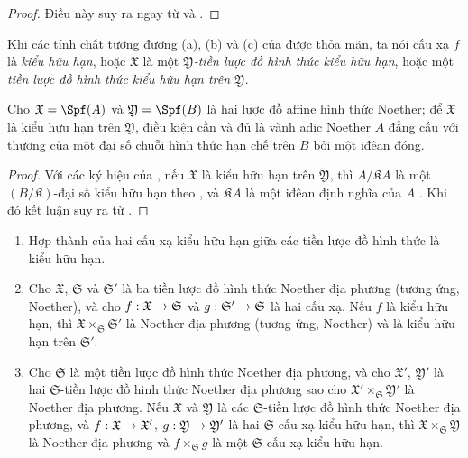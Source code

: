 \documentclass[oneside]{amsart}
\makeatletter
\newcommand{\ega@arrow}[2]{\mathchoice{#1}{#2}{#2}{#2}}
\renewcommand{\to}{\ega@arrow{\longrightarrow}{\rightarrow}}
\newcommand{\oldpage}[2][]{{\marginnote{\normalfont\textbf{#1}~|~#2}}\ignorespaces}
\let\EGAOriginalLabel\label
\renewcommand{\label}[1]{\phantomsection\EGAOriginalLabel{#1}}
\makeatother
\begin{document}
\begin{proof}
Điều này suy ra ngay từ  và .
\end{proof}

\begin{definition}[10.13.3]
\label{I.10.13.3}
Khi các tính chất tương đương (a), (b) và (c) của  được thỏa mãn, ta nói cấu xạ $f$ là \emph{kiểu hữu hạn}, hoặc $\mathfrak{X}$ là một \emph{$\mathfrak{Y}$-tiền lược đồ hình thức kiểu hữu hạn}, hoặc một \emph{tiền lược đồ hình thức kiểu hữu hạn trên $\mathfrak{Y}$}.
\end{definition}

\begin{corollary}[10.13.4]
\label{I.10.13.4}
Cho $\mathfrak{X}=\Spf(A)$ và $\mathfrak{Y}=\Spf(B)$ là hai lược đồ affine hình thức Noether;
để $\mathfrak{X}$ là kiểu hữu hạn trên $\mathfrak{Y}$, điều kiện cần và đủ là vành adic Noether $A$ đẳng cấu với thương của một đại số chuỗi hình thức hạn chế trên $B$ bởi một iđêan đóng.
\end{corollary}

\begin{proof}
Với các ký hiệu của , nếu $\mathfrak{X}$ là kiểu hữu hạn trên $\mathfrak{Y}$, thì $A/\mathfrak{K}A$ là một $(B/\mathfrak{K})$-đại số kiểu hữu hạn theo , và $\mathfrak{K}A$ là một iđêan định nghĩa của $A$ .
Khi đó kết luận suy ra từ .
\end{proof}

\begin{proposition}[10.13.5]
\label{I.10.13.5}
\medskip\noindent
\begin{enumerate}
  \item[\rm{(i)}] Hợp thành của hai cấu xạ kiểu hữu hạn giữa các tiền lược đồ hình thức là kiểu hữu hạn.
\oldpage[I]{209}
  \item[\rm{(ii)}] Cho $\mathfrak{X}$, $\mathfrak{S}$ và $\mathfrak{S}'$ là ba tiền lược đồ hình thức Noether địa phương (tương ứng, Noether), và cho $f:\mathfrak{X}\to\mathfrak{S}$ và $g:\mathfrak{S}'\to\mathfrak{S}$ là hai cấu xạ.
    Nếu $f$ là kiểu hữu hạn, thì $\mathfrak{X}\times_\mathfrak{S}\mathfrak{S}'$ là Noether địa phương (tương ứng, Noether) và là kiểu hữu hạn trên $\mathfrak{S}'$.
  \item[\rm{(iii)}] Cho $\mathfrak{S}$ là một tiền lược đồ hình thức Noether địa phương, và cho $\mathfrak{X}'$, $\mathfrak{Y}'$ là hai $\mathfrak{S}$-tiền lược đồ hình thức Noether địa phương sao cho $\mathfrak{X}'\times_\mathfrak{S}\mathfrak{Y}'$ là Noether địa phương.
    Nếu $\mathfrak{X}$ và $\mathfrak{Y}$ là các $\mathfrak{S}$-tiền lược đồ hình thức Noether địa phương, và $f:\mathfrak{X}\to\mathfrak{X}'$, $g:\mathfrak{Y}\to\mathfrak{Y}'$ là hai $\mathfrak{S}$-cấu xạ kiểu hữu hạn, thì $\mathfrak{X}\times_\mathfrak{S}\mathfrak{Y}$ là Noether địa phương và $f\times_\mathfrak{S}g$ là một $\mathfrak{S}$-cấu xạ kiểu hữu hạn.
\end{enumerate}
\end{proposition}
\end{document}
